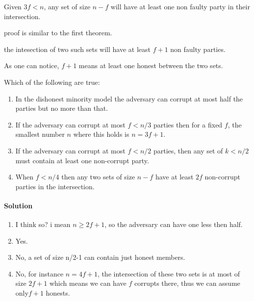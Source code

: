 \begin{thm}
    Given $3f<n$, any set of size $n-f$ will have at least one non faulty party in their intersection.
\end{thm}
proof is similar to the first theorem.

\begin{corollary}
    the intesection of two such sets will have at least $f+1$ non faulty parties.
\end{corollary}
As one can notice, $f+1$ means at least one honest between the two sets.
\begin{xca}
    Which of the following are true:
    \begin{enumerate}
        \item In the dishonest minority model the adversary can corrupt at most half the parties but
         no more than that.
        \item If the adversary can corrupt at most $f<n/3$ parties then for a fixed $f$, the 
        smallest number $n$ where this holds is $n=3f+1$.
        \item If the adversary can corrupt at most $f<n/2$ parties, then any set of $k<n/2$ must 
        contain at least one non-corrupt party.
        \item When $f<n/4$ then any two sets of size $n-f$ have at least $2f$ 
        non-corrupt parties in the intersection.
    \end{enumerate}
    
    \paragraph{Solution}

    \begin{enumerate}
        \item I think so? i mean $n\ge2f+1$, so the adversary can have one less then half.
        \item Yes.
        \item No, a set of size n/2-1 can contain just honest members.
        \item No, for instance $n=4f+1$, the intersection of these two sets is at most of size $2f+1$ which means we can have 
        $f$ corrupts there, thus we can assume only$f+1$ honests.
    \end{enumerate}


\end{xca}

